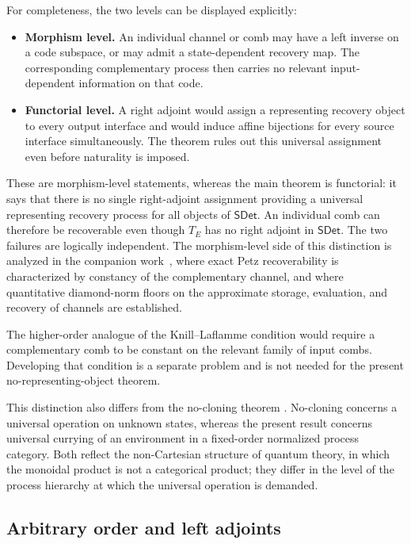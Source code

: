 \documentclass[11pt,a4paper]{article}
\theoremstyle{definition}
\theoremstyle{plain}
\theoremstyle{remark}
\newcommand{\SDet}{\mathsf{SDet}}
\begin{document}
For completeness, the two levels can be displayed explicitly:
\begin{itemize}
\item \textbf{Morphism level.} An individual channel or comb may have a left inverse on a code subspace, or may admit a state-dependent recovery map. The corresponding complementary process then carries no relevant input-dependent information on that code.
\item \textbf{Functorial level.} A right adjoint would assign a representing recovery object to every output interface and would induce affine bijections for every source interface simultaneously. The theorem rules out this universal assignment even before naturality is imposed.
\end{itemize}

These are morphism-level statements, whereas the main theorem is functorial: it says that there is no single right-adjoint assignment providing a universal representing recovery process for all objects of $\SDet$. An individual comb can therefore be recoverable even though $T_E$ has no right adjoint in $\SDet$. The two failures are logically independent. The morphism-level side of this distinction is analyzed in the companion work~\cite{abaeeCompanion2026}, where exact Petz recoverability is characterized by constancy of the complementary channel, and where quantitative diamond-norm floors on the approximate storage, evaluation, and recovery of channels are established.

The higher-order analogue of the Knill--Laflamme condition would require a complementary comb to be constant on the relevant family of input combs. Developing that condition is a separate problem and is not needed for the present no-representing-object theorem.

This distinction also differs from the no-cloning theorem \cite{dieks1982,wootters1982}. No-cloning concerns a universal operation on unknown states, whereas the present result concerns universal currying of an environment in a fixed-order normalized process category. Both reflect the non-Cartesian structure of quantum theory, in which the monoidal product is not a categorical product; they differ in the level of the process hierarchy at which the universal operation is demanded.

\subsection{Arbitrary order and left adjoints}
\end{document}
